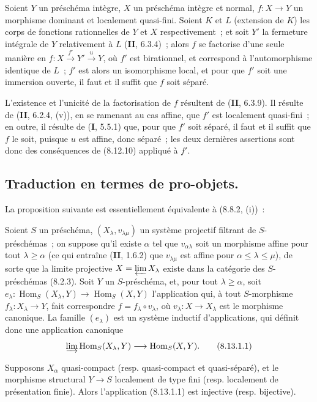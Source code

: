 \begin{corollary}[8.12.11]
Soient $Y$ un préschéma intègre, $X$ un préschéma intègre et normal,
$f:X\to Y$ un morphisme dominant et localement quasi-fini. Soient $K$ et
$L$ (extension de $K$) les corps de fonctions rationnelles de $Y$ et $X$
respectivement~; et soit $Y'$ la fermeture intégrale de $Y$ relativement à
$L$ \textup{(\textbf{II}, 6.3.4)}~; alors $f$ se factorise d'une seule manière en
$f:X\xrightarrow{f'}Y'\xrightarrow{u}Y$, où $f'$ est birationnel, et
correspond à l'automorphisme identique de $L$~; $f'$ est alors un
isomorphisme local, et pour que $f'$ soit une immersion ouverte, il faut et
il suffit que $f$ soit séparé.
\end{corollary}

L'existence et l'unicité de la factorisation de $f$ résultent de (\textbf{II}, 6.3.9).
Il résulte de (\textbf{II}, 6.2.4, (v)), en se ramenant au cas affine, que $f'$ est
localement quasi-fini~; en outre, il résulte de (\textbf{I}, 5.5.1) que, pour que
$f'$ soit séparé, il faut et il suffit que $f$ le soit, puisque $u$ est
affine, donc séparé~; les deux dernières assertions sont donc des
conséquences de (8.12.10) appliqué à $f'$.

\subsection{Traduction en termes de pro-objets.}
\label{subsection:IV.8.13-fr}

La proposition suivante est essentiellement équivalente à (8.8.2, (i))~:

\begin{proposition}[8.13.1]
\label{IV.8.13.1-fr}
Soient $S$ un préschéma, $(X_\lambda,v_{\lambda\mu})$ un système projectif
filtrant de $S$-préschémas~; on suppose qu'il existe $\alpha$ tel que
$v_{\alpha\lambda}$ soit un morphisme affine pour tout $\lambda\geqslant
\alpha$ (ce qui entraîne \textup{(\textbf{II}, 1.6.2)} que $v_{\lambda\mu}$ est affine pour
$\alpha\leqslant\lambda\leqslant\mu$), de sorte que la limite projective
$X=\varprojlim X_\lambda$ existe dans la catégorie des $S$-préschémas
\textup{(8.2.3)}. Soit $Y$ un $S$-préschéma, et, pour tout $\lambda\geqslant\alpha$,
soit
$e_\lambda:\operatorname{Hom}_S(X_\lambda,Y)
\to\operatorname{Hom}_S(X,Y)$
l'application qui, à tout $S$-morphisme $f_\lambda:X_\lambda\to Y$, fait
correspondre $f=f_\lambda\circ v_\lambda$, où $v_\lambda:X\to X_\lambda$
est le morphisme canonique. La famille $(e_\lambda)$ est un système inductif
d'applications, qui définit donc une application canonique
\begin{equation}
\label{IV.8.13.1.1-fr}
\varinjlim\operatorname{Hom}_S(X_\lambda,Y)
\longrightarrow\operatorname{Hom}_S(X,Y). \tag{8.13.1.1}
\end{equation}

Supposons $X_\alpha$ quasi-compact (\textup{resp.} quasi-compact et quasi-séparé), et le
morphisme structural $Y\to S$ localement de type fini (\textup{resp.} localement de
présentation finie). Alors l'application \textup{(8.13.1.1)} est injective (\textup{resp.}
bijective).
\end{proposition}


